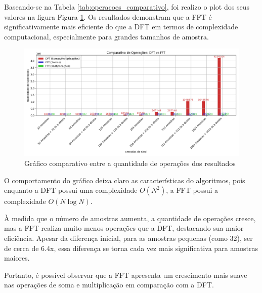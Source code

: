 Baseando-se na Tabela \ref{tab:operacoes_comparativo}, foi realizo o plot dos seus valores na figura Figura \ref{fig:operations_comparison_graph}. Os resultados demonstram que a FFT é significativamente mais eficiente do que a DFT em termos de complexidade computacional, especialmente para grandes tamanhos de amostra.

\begin{figure}[H]
    \centering
    \includegraphics[width=1\linewidth]{03_experimental_analysis//assets/operations_comparison.png}
    \caption{Gráfico comparativo entre a quantidade de operações dos resultados}
    \label{fig:operations_comparison_graph}
\end{figure}

O comportamento do gráfico deixa claro as características do algoritmos, pois enquanto a DFT possui uma complexidade $O(N^2)$, a FFT possui a complexidade $O(N\log{N})$.

À medida que o número de amostras aumenta, a quantidade de operações cresce, mas a FFT realiza muito menos operações que a DFT, destacando sua maior eficiência. Apesar da diferença inicial, para as amostras pequenas (como 32), ser de cerca de 6.4x, essa diferença se torna cada vez mais significativa para amostras maiores.

Portanto, é possível observar que a FFT apresenta um crescimento mais suave nas operações de soma e multiplicação em comparação com a DFT.
